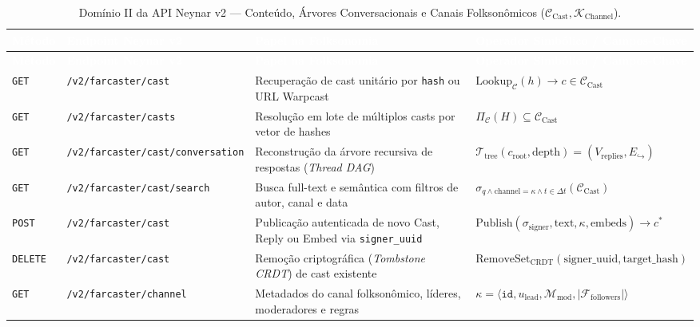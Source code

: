 \documentclass[11pt,a4paper]{article}
\begin{document}
\begin{longtable}{@{}p{1.15cm}>{\raggedright\arraybackslash}p{5.65cm}>{\raggedright\arraybackslash}p{4.15cm}>{\raggedright\arraybackslash}p{4.85cm}@{}}
\caption{Domínio II da API Neynar v2 --- Conteúdo, Árvores Conversacionais e Canais Folksonômicos ($\mathcal{C}_{\text{Cast}}, \mathcal{K}_{\text{Channel}}$).}\label{tab:neynar_casts_channels}\\
\toprule
\rowcolor{neynarDark}
\textcolor{white}{\textbf{Método}} & \textcolor{white}{\textbf{Endpoint Neynar v2}} & \textcolor{white}{\textbf{Papel na Folksonomia}} & \textcolor{white}{\textbf{Operador Simbólico / Campos-Chave}} \\
\midrule
\endfirsthead
\toprule
\rowcolor{neynarDark}
\textcolor{white}{\textbf{Método}} & \textcolor{white}{\textbf{Endpoint Neynar v2}} & \textcolor{white}{\textbf{Papel na Folksonomia}} & \textcolor{white}{\textbf{Operador Simbólico / Campos-Chave}} \\
\midrule
\endhead
\bottomrule
\endlastfoot
\texttt{GET} & \texttt{/v2/farcaster/cast} & Recuperação de cast unitário por \texttt{hash} ou URL Warpcast & $\text{Lookup}_{\mathcal{C}}(h) \to c \in \mathcal{C}_{\text{Cast}}$ \\
\rowcolor{slateBg}
\texttt{GET} & \texttt{/v2/farcaster/casts} & Resolução em lote de múltiplos casts por vetor de hashes & $\Pi_{\mathcal{C}}(H) \subseteq \mathcal{C}_{\text{Cast}}$ \\
\texttt{GET} & \texttt{/v2/farcaster/cast/conversation} & Reconstrução da árvore recursiva de respostas (\emph{Thread DAG}) & $\mathcal{T}_{\text{tree}}(c_{\text{root}}, \text{depth}) = (V_{\text{replies}}, E_{\hookrightarrow})$ \\
\rowcolor{slateBg}
\texttt{GET} & \texttt{/v2/farcaster/cast/search} & Busca full-text e semântica com filtros de autor, canal e data & $\sigma_{q \land \text{channel}=\kappa \land t \in \Delta t}(\mathcal{C}_{\text{Cast}})$ \\
\texttt{POST} & \texttt{/v2/farcaster/cast} & Publicação autenticada de novo Cast, Reply ou Embed via \texttt{signer\_uuid} & $\text{Publish}(\sigma_{\text{signer}}, \text{text}, \kappa, \text{embeds}) \to c^*$ \\
\rowcolor{slateBg}
\texttt{DELETE} & \texttt{/v2/farcaster/cast} & Remoção criptográfica (\emph{Tombstone CRDT}) de cast existente & $\text{RemoveSet}_{\text{CRDT}}(\text{signer\_uuid}, \text{target\_hash})$ \\
\texttt{GET} & \texttt{/v2/farcaster/channel} & Metadados do canal folksonômico, líderes, moderadores e regras & $\kappa = \langle \texttt{id}, u_{\text{lead}}, \mathcal{M}_{\text{mod}}, |\mathcal{F}_{\text{followers}}| \rangle$ \\

\end{longtable}
\end{document}
